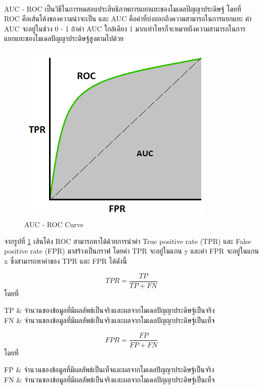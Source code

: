 AUC - ROC\textsuperscript{\cite{auc_roc}} เป็นวิธีในการทดสอบประสิทธิภาพการแยกแยะของโมเดลปัญญาประดิษฐ์ โดยที่ ROC คือเส้นโค้งของความน่าจะเป็น และ AUC คือค่าที่บ่งบอกถึงความสามารถในการแยกแยะ ค่า AUC จะอยู่ในช่วง 0 - 1 ถ้าค่า AUC ใกล้เคียง 1 มากเท่าไหรก็จะหมายถึงความสามารถในการแยกแยะของโมเดลปัญญาประดิษฐ์สูงตามไปด้วย

\begin{figure}[!ht]
	\centering
	\includegraphics[scale=0.5]{chapter2/images/auc_roc.png}
		\caption[AUC - ROC Curve]{AUC - ROC Curve\textsuperscript{\cite{auc_roc}}}
    	\label{fig:auc_roc}
\end{figure} 

จากรูปที่ \ref{fig:auc_roc} เส้นโค้ง ROC สามารถหาได้ด้วยการนำค่า True positive rate (TPR) และ False positive rate (FPR) มาสร้างเป็นกราฟ โดยค่า TPR จะอยู่ในแกน y และค่า FPR จะอยู่ในแกน x ซึ่งสามารถหาค่าของ TPR และ FPR ได้ดังนี้

\begin{equation}
TPR = \frac{TP}{TP + FN}
\end{equation}
โดยที่
\begin{conditions}
TP		&		จำนวนของข้อมูลที่มีผลลัพธ์เป็นจริงและผลจากโมเดลปัญญาประดิษฐ์เป็นจริง		\\
FN		&		จำนวนของข้อมูลที่มีผลลัพธ์เป็นจริงและผลจากโมเดลปัญญาประดิษฐ์เป็นเท็จ
\end{conditions}

\begin{equation}
FPR = \frac{FP}{FP + FN}
\end{equation}
โดยที่
\begin{conditions}
FP		&		จำนวนของข้อมูลที่มีผลลัพธ์เป็นเท็จและผลจากโมเดลปัญญาประดิษฐ์เป็นจริง		\\
FN		&		จำนวนของข้อมูลที่มีผลลัพธ์เป็นจริงและผลจากโมเดลปัญญาประดิษฐ์เป็นเท็จ
\end{conditions}